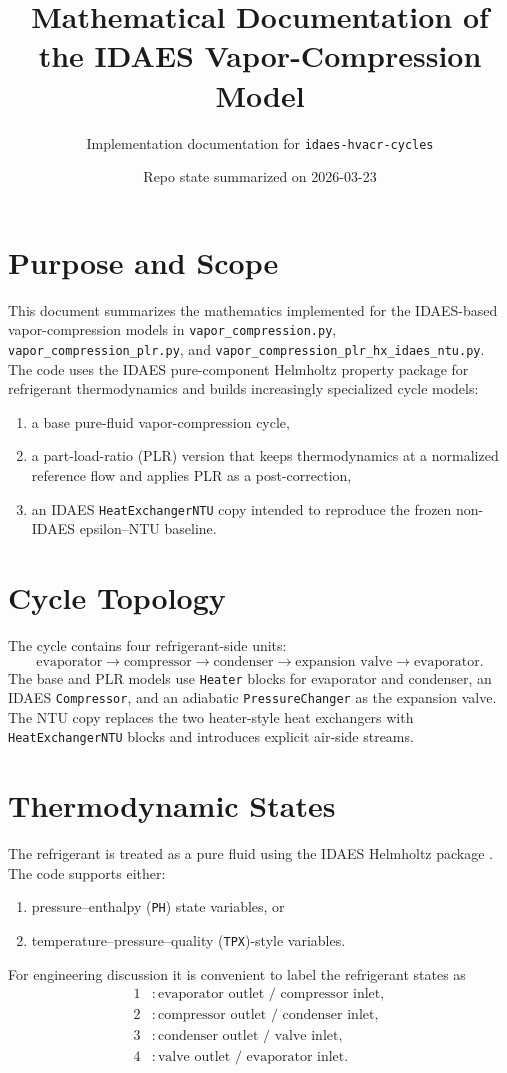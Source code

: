 \documentclass[11pt]{article}
\title{Mathematical Documentation of the IDAES Vapor-Compression Model}
\author{Implementation documentation for \texttt{idaes-hvacr-cycles}}
\date{Repo state summarized on 2026-03-23}
\begin{document}
\maketitle

\section{Purpose and Scope}
This document summarizes the mathematics implemented for the IDAES-based vapor-compression models in \texttt{vapor\_compression.py}, \texttt{vapor\_compression\_plr.py}, and \texttt{vapor\_compression\_plr\_hx\_idaes\_ntu.py}. The code uses the IDAES pure-component Helmholtz property package for refrigerant thermodynamics and builds increasingly specialized cycle models:
\begin{enumerate}
\item a base pure-fluid vapor-compression cycle,
\item a part-load-ratio (PLR) version that keeps thermodynamics at a normalized reference flow and applies PLR as a post-correction,
\item an IDAES \texttt{HeatExchangerNTU} copy intended to reproduce the frozen non-IDAES epsilon--NTU baseline.
\end{enumerate}

\section{Cycle Topology}
The cycle contains four refrigerant-side units:
\begin{equation}
\text{evaporator} \rightarrow \text{compressor} \rightarrow \text{condenser} \rightarrow \text{expansion valve} \rightarrow \text{evaporator}.
\end{equation}
The base and PLR models use \texttt{Heater} blocks for evaporator and condenser, an IDAES \texttt{Compressor}, and an adiabatic \texttt{PressureChanger} as the expansion valve. The NTU copy replaces the two heater-style heat exchangers with \texttt{HeatExchangerNTU} blocks and introduces explicit air-side streams.

\section{Thermodynamic States}
The refrigerant is treated as a pure fluid using the IDAES Helmholtz package \cite{idaes_helmholtz}. The code supports either:
\begin{enumerate}
\item pressure--enthalpy (\texttt{PH}) state variables, or
\item temperature--pressure--quality (\texttt{TPX})-style variables.
\end{enumerate}
For engineering discussion it is convenient to label the refrigerant states as
\begin{align}
1 &: \text{evaporator outlet / compressor inlet}, \\
2 &: \text{compressor outlet / condenser inlet}, \\
3 &: \text{condenser outlet / valve inlet}, \\
4 &: \text{valve outlet / evaporator inlet}.
\end{align}
\end{document}
